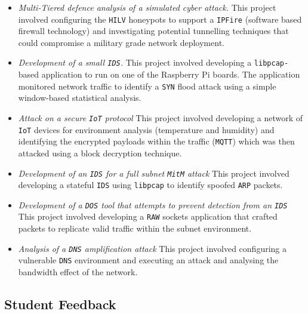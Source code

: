\documentclass{ieeeaccess}
\begin{document}
\begin{itemize} 
  \item \noindent \emph{Multi-Tiered defence analysis of a simulated cyber
    attack.} This project involved configuring the \texttt{HILV} honeypots to
    support a \texttt{IPFire} (software based firewall technology) and
    investigating potential tunnelling techniques that could compromise a
    military grade network deployment.  
  \item \noindent \emph{Development of a small \texttt{IDS}.} This project
    involved developing a \texttt{libpcap-}based application to run on one of the
    Raspberry Pi boards. The application monitored network
    traffic to identify a \texttt{SYN} flood attack using a simple window-based
    statistical analysis.  
    \item \noindent \emph{Attack on a secure \texttt{IoT} protocol} This
      project involved developing a network of \texttt{IoT} devices for
      environment analysis (temperature and humidity) and identifying the
      encrypted payloads within the traffic (\texttt{MQTT}) which was then attacked using a block
      decryption technique.  
    \item \noindent \emph{Development of an \texttt{IDS} for a full subnet
      \texttt{MitM} attack} This project involved developing a stateful 
      \texttt{IDS} using \texttt{libpcap} to identify spoofed \texttt{ARP} packets.  
    \item \noindent \emph{Development of a \texttt{DOS} tool that attempts to
      prevent detection from an \texttt{IDS}} This project involved developing
      a \texttt{RAW} sockets application that crafted packets to
      replicate valid traffic within the subnet environment.  
     \item \noindent \emph{Analysis of a \texttt{DNS} amplification attack} This
       project involved configuring a vulnerable \texttt{DNS} environment and
       executing an attack and analysing the bandwidth effect of the network.
\end{itemize}

\subsection{Student Feedback}\label{sec:Feedback}
\end{document}
